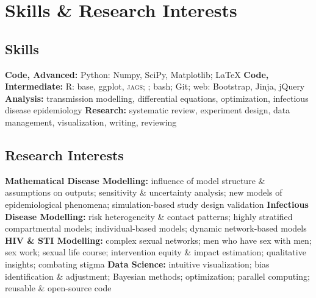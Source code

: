 \clearpage %
\section{Skills \& Research Interests}\nodate
\subsection{Skills}
\bullet \textbf{Code, Advanced:} Python: Numpy, SciPy, Matplotlib; \LaTeX
\bullet \textbf{Code, Intermediate:} R: base, ggplot, \textsc{jags}; \matlab; bash; Git; web: Bootstrap, Jinja, jQuery
\bullet \textbf{Analysis:} transmission modelling, differential equations, optimization, infectious disease epidemiology
\bullet \textbf{Research:} systematic review, experiment design, data management, visualization, writing, reviewing
\subsection{Research Interests}\nodate
\bullet \textbf{Mathematical Disease Modelling:}
        influence of model structure \& assumptions on outputs;
        sensitivity \& uncertainty analysis;
        new models of epidemiological phenomena;
        simulation-based study design validation
\bullet \textbf{Infectious Disease Modelling:}
        risk heterogeneity \& contact patterns;
        highly stratified compartmental models;
        individual-based models;
        dynamic network-based models
\bullet \textbf{HIV \& STI Modelling:}
        complex sexual networks;
        men who have sex with men;
        sex work;
        sexual life course;
        intervention equity \& impact estimation;
        qualitative insights;
        combating stigma
\bullet \textbf{Data Science:}
        intuitive visualization;
        bias identification \& adjustment;
        Bayesian methods;
        optimization;
        parallel computing;
        reusable \& open-source code
